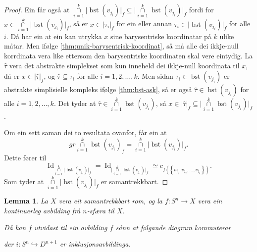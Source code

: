 \documentclass[a4paper, 12pt, norsk]{article}
\theoremstyle{plain}
\newtheorem{lemma}[theorem]{Lemma}
\theoremstyle{definition}
\newcommand{\intersect}{ \mathop{\cap}\limits }
\newcommand{\gr}[1]{ \lvert #1 \rvert } %
\newcommand{\set}[1]{ \left\{ #1 \right\} } %
\DeclareMathOperator{\bst}{bst} %
\DeclareMathOperator{\Id}{Id} %
\begin{document}
\begin{proof}
	Ein får også at \( \intersect_{i = 1}^k \gr{\bst(v_{j_i})}_f \subseteq \gr{\intersect_{i = 1}^k \bst(v_{j_i})}_f \) fordi for \( x \in \intersect_{i = 1}^k \gr{\bst(v_{j_i})}_f \), så er \( x \in \gr{\tau_i}_f \) for ein eller annan \( \tau_i \in \gr{\bst(v_{j_i})}_f \) for alle \( i \). Då har ein at ein kan utrykka \( x \) sine barysentriske koordinatar på \( k \) ulike måtar. Men ifølge \autoref{thm:unik-barysentrisk-koordinat}, så må alle dei ikkje-null korrdinata vera like ettersom den barysentriske koordinaten skal vere eintydig. La \( \hat{\tau} \) vera det abstrakte simplekset som kun inneheld dei ikkje-null koordinata til \( x \), då er \( x \in \gr{\hat{\tau}}_f \), og \( \hat{\tau} \subseteq \tau_i \) for alle \( i = 1, 2, \dots, k \). Men sidan \( \tau_i \in \bst(v_{j_i}) \) er abstrakte simplisielle kompleks ifølge \autoref{thm:bst-ask}, så er også \( \hat{\tau} \in  \bst(v_{j_i}) \) for alle \( i = 1, 2, \dots, k \). Det tyder at \( \hat{\tau} \in \intersect_{i = 1}^k \bst(v_{j_i}) \), så \( x \in \gr{\hat{\tau}}_f \subseteq \gr{\intersect_{i = 1}^k \bst(v_{j_i})}_f \).
	
	Om ein sett saman dei to resultata ovanfor, får ein at
	\[
		gr{\intersect_{i = 1}^k \bst(v_{j_i})}_f = \intersect_{i = 1}^k \gr{\bst(v_{j_i})}_f.
	\]
	Dette fører til
	\[ 
		\Id_{\intersect_{i = 1}^k \gr{\bst(v_{j_i})}_f} = \Id_{\gr{\intersect_{i = 1}^k \bst(v_{j_i})}_f} \simeq c_{f(\set{v_{j_1}, v_{j_2}, \dots, v_{j_k}})}.
	\]
	Som tyder at \( \intersect_{i = 1}^k \gr{\bst(v_{j_i})}_f \) er samantrekkbart.
\end{proof}

\begin{lemma} \label{thm:utvida-avb}
	La \( X \) vera eit samantrekkbart rom, og la \( f: S^n \to X \) vera ein kontinuerleg avbilding frå \( n \)-sfæra til \( X \). 
	
	Då kan \( f \) utvidast til ein avbilding \( \hat{f} \) sånn at følgande diagram kommuterar

	\begin{center}
	\end{center}
	der \( i: S^n \hookrightarrow D^{n+1} \) er inklusjonsavbildinga.
\end{lemma}
\end{document}
